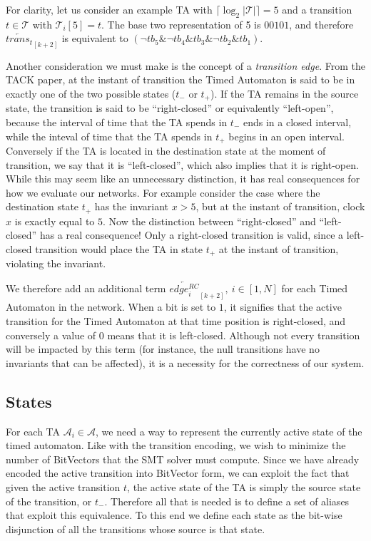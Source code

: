 \documentclass[a4paper,12pt]{article}
\newcommand*\BitAnd{\mathbin{\&}}
\begin{document}
For clarity, let us consider an example TA with
\(\lceil\log_2 |\mathcal{T}|\rceil = 5\) and a transition \(t \in \mathcal{T}\)
with \(\mathcal{T}_{i}[5] = t\). The base two representation of 5 is \(00101\), and therefore
\(\overleftarrow{trans_t}_{[k+2]}\) is equivalent to \((\neg tb_5 \BitAnd
\neg tb_4 \BitAnd tb_3 \BitAnd \neg tb_2 \BitAnd tb_1)\).

Another consideration we must make is the concept of a \emph{transition edge}.
From the TACK paper, at the instant of transition the Timed Automaton is said to
be in exactly one of the two possible states (\(t_{-}\) or \(t_{+}\)). If the TA
remains in the source state, the transition is said to be ``right-closed'' or
equivalently ``left-open'', because the interval of time that the TA spends in
\(t_{-}\) ends in a closed interval, while the inteval of time that the TA
spends in \(t_{+}\) begins in an open interval. Conversely if the TA is located
in the destination state at the moment of transition, we say that it is
``left-closed'', which also implies that it is right-open. While this may seem
like an unnecessary distinction, it has real consequences for how we evaluate
our networks. For example consider the case where the destination state
\(t_{+}\) has the invariant \(x > 5\), but at the instant of transition, clock
\(x\) is exactly equal to \(5\). Now the distinction between ``right-closed''
and ``left-closed'' has a real consequence! Only a right-closed transition is
valid, since a left-closed transition would place the TA in state \(t_{+}\) at
the instant of transition, violating the invariant.

We therefore add an additional term
\(\overleftarrow{edge_{i}^{RC}}_{[k{+}2]},\ i \in [1,N]\) for each Timed
Automaton in the network. When a bit is set to \(1\), it signifies that the
active transition for the Timed Automaton at that time position is right-closed,
and conversely a value of \(0\) means that it is left-closed. Although not every
transition will be impacted by this term (for instance, the null transitions
have no invariants that can be affected), it is a necessity for the correctness
of our system.


\subsection{States}\label{encoding-states}

For each TA \(\mathcal{A}_i \in \mathcal{A}\), we need a way to represent the
currently active state of the timed automaton. Like with the transition
encoding, we wish to minimize the number of BitVectors that the SMT solver must
compute. Since we have already encoded the active transition into BitVector
form, we can exploit the fact that given the active transition \(t\), the active
state of the TA is simply the source state of the transition, or \(t_{-}\).
Therefore all that is needed is to define a set of aliases that exploit this
equivalence. To this end we define each state as the bit-wise disjunction of all
the transitions whose source is that state.
\end{document}
